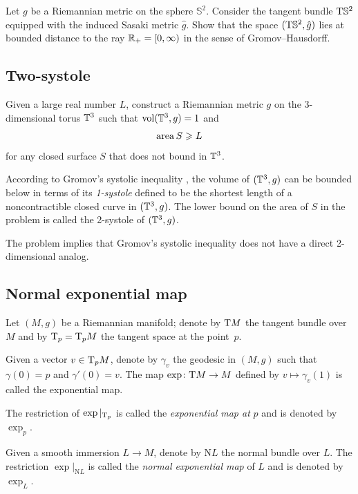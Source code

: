 \begin{pr}
Let $g$ be a Riemannian metric on the sphere $\mathbb{S}^2$.
Consider the tangent bundle $\mathrm{T} \mathbb{S}^2$ 
equipped with the induced Sasaki metric $\hat g$.
Show that
the space $(\mathrm{T} \mathbb{S}^2, \hat g)$ lies at bounded distance to the ray $\mathbb{R}_+=[0,\infty)$ in the sense of Gromov--Hausdorff.
\end{pr}


\subsection*{Two-systole}

\begin{pr} Given a large real number $L$,
construct a Riemannian metric $g$ on the 3-dimensional torus $\mathbb{T}^3$ such that $\operatorname{\rm vol}\nolimits(\mathbb{T}^3,g)=1$
and \[\operatorname{\rm area}\nolimits S\geqslant L\]
for any closed surface $S$ that does not bound in $\mathbb{T}^3$.
\end{pr}

According to Gromov's systolic inequality \cite{gromov-filling}, the volume of $(\mathbb{T}^3,g)$ can be bounded below in terms of its \emph{1-systole} defined to be the shortest length of a noncontractible closed curve in $(\mathbb{T}^3,g)$.
The lower bound on the area of $S$ in the problem is called the 2-systole of $(\mathbb{T}^3,g)$.

The problem implies that Gromov's systolic inequality does not have a direct 2-dimensional analog.

\subsection*{Normal exponential map\easy}
\label{Normal exponential map}
\label{page:Normal exponential map}

Let $(M,g)$ be a Riemannian manifold;
denote by $\mathrm{T} M$ the tangent bundle over $M$ and by $\mathrm{T}_p=\mathrm{T}_pM$ the tangent space at the point~$p$.

Given a vector $v\in\mathrm{T}_pM$, denote by $\gamma_v$ the geodesic in $(M,g)$
such that $\gamma(0)=p$ and $\gamma'(0)=v$.
The map $\exp\colon\mathrm{T} M\to M$ defined by $v\mapsto \gamma_v(1)$ is called the exponential map.

The restriction of $\exp|_{\mathrm{T}_p}$ is called the \emph{exponential map at} $p$ and is denoted by $\exp_p$.

Given a smooth immersion $L\to M$,
denote by $\mathrm{N} L$ the normal bundle over $L$.
The restriction $\exp|_{\mathrm{N} L}$ is called the {}\emph{normal exponential map} of $L$ and is denoted by $\exp_L$.

